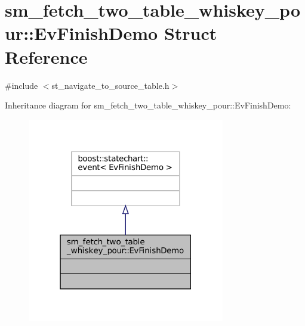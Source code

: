 \hypertarget{structsm__fetch__two__table__whiskey__pour_1_1EvFinishDemo}{}\section{sm\+\_\+fetch\+\_\+two\+\_\+table\+\_\+whiskey\+\_\+pour\+:\+:Ev\+Finish\+Demo Struct Reference}
\label{structsm__fetch__two__table__whiskey__pour_1_1EvFinishDemo}


{\ttfamily \#include $<$st\+\_\+navigate\+\_\+to\+\_\+source\+\_\+table.\+h$>$}



Inheritance diagram for sm\+\_\+fetch\+\_\+two\+\_\+table\+\_\+whiskey\+\_\+pour\+:\+:Ev\+Finish\+Demo\+:
\nopagebreak
\begin{figure}[H]
\begin{center}
\leavevmode
\includegraphics[width=244pt]{structsm__fetch__two__table__whiskey__pour_1_1EvFinishDemo__inherit__graph}
\end{center}
\end{figure}


